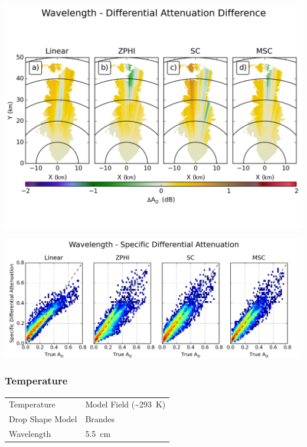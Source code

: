\documentclass[red]{beamer}
\begin{document}
\begin{frame}
	\begin{center}
		\includegraphics[scale=0.45]{figures/C_Wavelength_Differential_Attenuation_Difference.png}
	\end{center}
\end{frame}

\begin{frame}
	\begin{center}
		\includegraphics[scale=0.45]{figures/C_Wavelength_Specific_Differential_Attenuation_scatter.png}
	\end{center}
\end{frame}

\begin{frame}
	\frametitle{Temperature}
	\begin{center}
	    \begin{tabular}{ | l | l | }
	        \hline
	        Temperature & Model Field (\textasciitilde\SI{293}{\kelvin}) \\
	        Drop Shape Model & Brandes \\
	        Wavelength & \SI{5.5}{\centi\meter} \\
			\hline
	    \end{tabular}
	\end{center}	
\end{frame}
\end{document}
